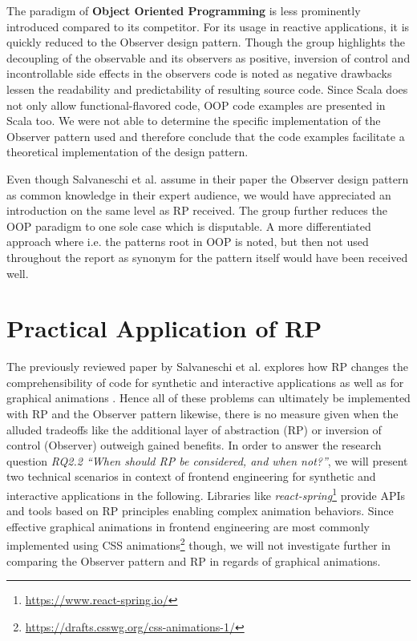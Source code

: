 \documentclass[12pt,a4paper]{article}
\begin{document}
The paradigm of \textbf{Object Oriented Programming} is less prominently introduced compared to its competitor. For its usage in reactive applications, it is quickly reduced to the Observer design pattern. Though the group highlights the decoupling of the observable and its observers as positive, inversion of control and incontrollable side effects in the observers code is noted as negative drawbacks lessen the readability and predictability of resulting source code. Since Scala does not only allow functional-flavored code, OOP code examples are presented in Scala too. We were not able to determine the specific implementation of the Observer pattern used and therefore conclude that the code examples facilitate a theoretical implementation of the design pattern.

Even though Salvaneschi et al. assume in their paper the Observer design pattern as common knowledge in their expert audience, we would have appreciated an introduction on the same level as RP received. The group further reduces the OOP paradigm to one sole case which is disputable. A more differentiated approach where i.e. the patterns root in OOP is noted, but then not used throughout the report as synonym for the pattern itself would have been received well.

\section{Practical Application of RP}
\label{sec:practical-application}

The previously reviewed paper by Salvaneschi et al. explores how RP changes the comprehensibility of code for synthetic and interactive applications as well as for graphical animations \cite{7827078}. Hence all of these problems can ultimately be implemented with RP and the Observer pattern likewise, there is no measure given when the alluded tradeoffs like the additional layer of abstraction (RP) or inversion of control (Observer) outweigh gained benefits. In order to answer the research question \emph{RQ2.2 ``When should RP be considered, and when not?''}, we will present two technical scenarios in context of frontend engineering for synthetic and interactive applications in the following. Libraries like \emph{react-spring}\footnote{\url{https://www.react-spring.io/}} provide APIs and tools based on RP principles enabling complex animation behaviors. Since effective graphical animations in frontend engineering are most commonly implemented using CSS animations\footnote{\url{https://drafts.csswg.org/css-animations-1/}} though, we will not investigate further in comparing the Observer pattern and RP in regards of graphical animations.
\end{document}
